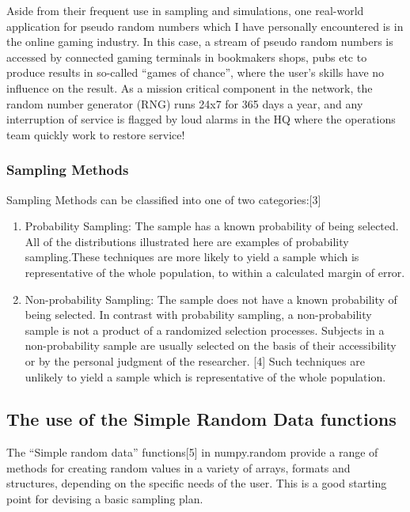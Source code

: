 \documentclass[11pt]{article}
\begin{document}
Aside from their frequent use in sampling and simulations, one
real-world application for pseudo random numbers which I have personally
encountered is in the online gaming industry. In this case, a stream of
pseudo random numbers is accessed by connected gaming terminals in
bookmakers shops, pubs etc to produce results in so-called ``games of
chance'', where the user's skills have no influence on the result. As a
mission critical component in the network, the random number generator
(RNG) runs 24x7 for 365 days a year, and any interruption of service is
flagged by loud alarms in the HQ where the operations team quickly work
to restore service!

    \subsubsection{Sampling Methods}\label{sampling-methods}

Sampling Methods can be classified into one of two categories:{[}3{]}

\begin{enumerate}
\def\labelenumi{\arabic{enumi})}
\item
  Probability Sampling: The sample has a known probability of being
  selected. All of the distributions illustrated here are examples of
  probability sampling.These techniques are more likely to yield a
  sample which is representative of the whole population, to within a
  calculated margin of error.
\item
  Non-probability Sampling: The sample does not have a known probability
  of being selected. In contrast with probability sampling, a
  non-probability sample is not a product of a randomized selection
  processes. Subjects in a non-probability sample are usually selected
  on the basis of their accessibility or by the personal judgment of the
  researcher. {[}4{]} Such techniques are unlikely to yield a sample
  which is representative of the whole population.
\end{enumerate}

    \subsection{The use of the Simple Random Data
functions}\label{the-use-of-the-simple-random-data-functions}

The ``Simple random data'' functions{[}5{]} in numpy.random provide a
range of methods for creating random values in a variety of arrays,
formats and structures, depending on the specific needs of the user.
This is a good starting point for devising a basic sampling plan.
\end{document}
